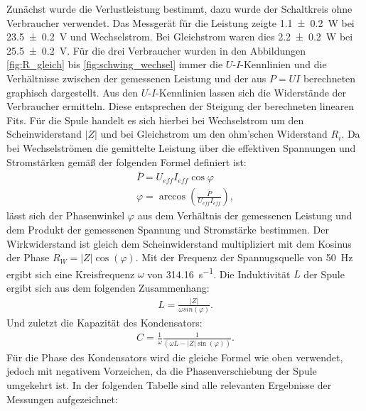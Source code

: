Zunächst wurde die Verlustleistung bestimmt, dazu wurde der Schaltkreis ohne Verbraucher verwendet. 
Das Messgerät für die Leistung zeigte \SI{1,1+-0,2}{\W} bei \SI{23,5+-0,2}{\V} und Wechselstrom. 
Bei Gleichstrom waren dies \SI{2,2+-0,2}{\W} bei \SI{25,5+-0,2}{\V}.
Für die drei Verbraucher wurden in den Abbildungen \ref{fig:R_gleich} bis \ref{fig:schwing_wechsel} immer die $U$-$I$-Kennlinien und die Verhältnisse zwischen der gemessenen Leistung und der aus $P = UI$ berechneten graphisch dargestellt.
Aus den $U$-$I$-Kennlinien lassen sich die Widerstände der Verbraucher ermitteln. Diese entsprechen der Steigung der berechneten linearen Fits. Für die Spule handelt es sich hierbei bei Wechselstrom um den Scheinwiderstand $|Z|$ und bei Gleichstrom um den ohm'schen Widerstand $R_i$.
Da bei Wechselströmen die gemittelte Leistung über die effektiven Spannungen und Stromstärken gemäß der folgenden Formel definiert ist:
\begin{align}
	\bar{P} = U_{eff}I_{eff}\cos{\varphi} \\
	\varphi = \arccos{\left( \frac{\bar{P}}{U_{eff}I_{eff}}\right) },
\end{align}
lässt sich der Phasenwinkel $\varphi$ aus dem Verhältnis der gemessenen Leistung und dem Produkt der gemessenen Spannung und Stromstärke bestimmen. Der Wirkwiderstand ist gleich dem Scheinwiderstand multipliziert mit dem Kosinus der Phase $R_W = |Z|\cos(\varphi)$.
Mit der Frequenz der Spannugsquelle von \SI{50}{\Hz} ergibt sich eine Kreisfrequenz $\omega$ von \SI{314,16}{\s^{-1}}.
Die Induktivität $L$ der Spule ergibt sich aus dem folgenden Zusammenhang:
\begin{align}
	L = \frac{|Z|}{\omega sin(\varphi)}. 
\end{align}
Und zuletzt die Kapazität des Kondensators:
\begin{align}
	C = \frac{1}{\omega}\frac{1}{(\omega L - |Z|\sin (\varphi))}. 
\end{align} 
Für die Phase des Kondensators wird die gleiche Formel wie oben verwendet, jedoch mit negativem Vorzeichen, da die Phasenverschiebung der Spule umgekehrt ist.
In der folgenden Tabelle sind alle relevanten Ergebnisse der Messungen aufgezeichnet:
